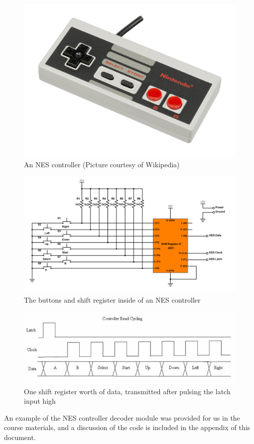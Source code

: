 \documentclass[a4paper]{article}
\begin{document}
\begin{figure}[H]
    \includegraphics[width=0.6 \linewidth]{images/NEScontroller.jpg}
    \caption{An NES controller (Picture courtesy of Wikipedia)}
    \label{nesController}
\end{figure}

\begin{figure}[H]
    \includegraphics[width=0.8 \linewidth]{images/nesSchema.png}
    \caption{The buttons and shift register inside of an NES controller}
    \label{nesSchematic}
\end{figure}


\begin{figure}[H]
    \includegraphics[width=0.8 \linewidth]{images/nesclock.jpg}
    \caption{One shift register worth of data, transmitted after pulsing the latch input high}
    \label{nesClock}
\end{figure}

An example of the NES controller decoder module was provided for us in the course materials, and a discussion of the code is included in the appendix of this document.
\end{document}
